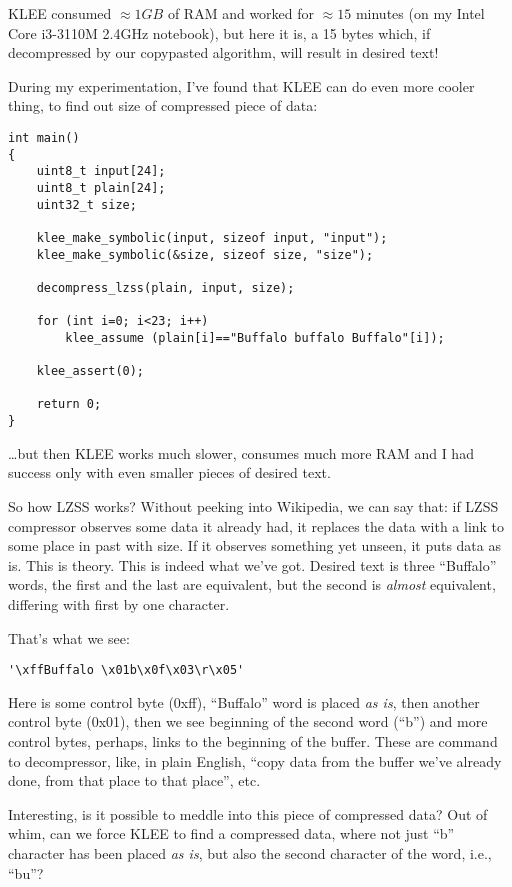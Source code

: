 KLEE consumed $\approx 1GB$ of RAM and worked for $\approx 15$ minutes (on my Intel Core i3-3110M 2.4GHz notebook), 
but here it is, a 15 bytes which, if decompressed by our copypasted algorithm, will result in desired text!

During my experimentation, I've found that KLEE can do even more cooler thing, to find out size of compressed piece of data:

\begin{lstlisting}
int main()
{
	uint8_t input[24];
	uint8_t plain[24];
	uint32_t size;
  
	klee_make_symbolic(input, sizeof input, "input");
	klee_make_symbolic(&size, sizeof size, "size");
	
	decompress_lzss(plain, input, size);

	for (int i=0; i<23; i++)
		klee_assume (plain[i]=="Buffalo buffalo Buffalo"[i]);

	klee_assert(0);
	
	return 0;
}
\end{lstlisting}

\dots but then KLEE works much slower, consumes much more RAM and I had success only with even smaller pieces of desired text.

So how \ac{LZSS} works? Without peeking into Wikipedia, we can say that: 
if \ac{LZSS} compressor observes some data it already had, it replaces the data with a link to some place in past with size. 
If it observes something yet unseen, it puts data as is.
This is theory.
This is indeed what we've got. Desired text is three ``Buffalo'' words, the first and the last are equivalent, but the second is \emph{almost} equivalent, 
differing with first by one character.

That's what we see:

\begin{lstlisting}
'\xffBuffalo \x01b\x0f\x03\r\x05'
\end{lstlisting}

Here is some control byte (0xff), ``Buffalo'' word is placed \emph{as is}, then another control byte (0x01), 
then we see beginning of the second word (``b'') and more
control bytes, perhaps, links to the beginning of the buffer.
These are command to decompressor, like, in plain English, ``copy data from the buffer we've already done, from that place to that place'', etc.

Interesting, is it possible to meddle into this piece of compressed data?
Out of whim, can we force KLEE to find a compressed data, where not just ``b'' character has been placed \emph{as is},
but also the second character of the word, i.e., ``bu''?

